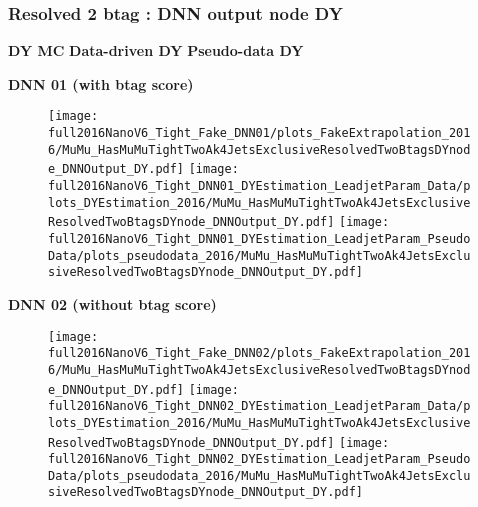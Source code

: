 \documentclass[9pt]{beamer}
\begin{document}
\begin{frame}
	\frametitle{Resolved 2 btag : DNN output node DY}
    \hspace{2cm} \textbf{DY MC} \hspace{1.9cm} \textbf{Data-driven DY} \hspace{1cm} \textbf{Pseudo-data DY}
    \begin{center}
        \textbf{DNN 01 (with btag score)}
    \end{center}
	\begin{figure}
		\texttt{[image: full2016NanoV6\_Tight\_Fake\_DNN01/plots\_FakeExtrapolation\_2016/MuMu\_HasMuMuTightTwoAk4JetsExclusiveResolvedTwoBtagsDYnode\_DNNOutput\_DY.pdf]}
		\texttt{[image: full2016NanoV6\_Tight\_DNN01\_DYEstimation\_LeadjetParam\_Data/plots\_DYEstimation\_2016/MuMu\_HasMuMuTightTwoAk4JetsExclusiveResolvedTwoBtagsDYnode\_DNNOutput\_DY.pdf]}
		\texttt{[image: full2016NanoV6\_Tight\_DNN01\_DYEstimation\_LeadjetParam\_PseudoData/plots\_pseudodata\_2016/MuMu\_HasMuMuTightTwoAk4JetsExclusiveResolvedTwoBtagsDYnode\_DNNOutput\_DY.pdf]}
	\end{figure}
    \begin{center}
        \textbf{DNN 02 (without btag score)}
    \end{center}
	\begin{figure}
		\texttt{[image: full2016NanoV6\_Tight\_Fake\_DNN02/plots\_FakeExtrapolation\_2016/MuMu\_HasMuMuTightTwoAk4JetsExclusiveResolvedTwoBtagsDYnode\_DNNOutput\_DY.pdf]}
		\texttt{[image: full2016NanoV6\_Tight\_DNN02\_DYEstimation\_LeadjetParam\_Data/plots\_DYEstimation\_2016/MuMu\_HasMuMuTightTwoAk4JetsExclusiveResolvedTwoBtagsDYnode\_DNNOutput\_DY.pdf]}
		\texttt{[image: full2016NanoV6\_Tight\_DNN02\_DYEstimation\_LeadjetParam\_PseudoData/plots\_pseudodata\_2016/MuMu\_HasMuMuTightTwoAk4JetsExclusiveResolvedTwoBtagsDYnode\_DNNOutput\_DY.pdf]}
	\end{figure}
\end{frame}
\end{document}

